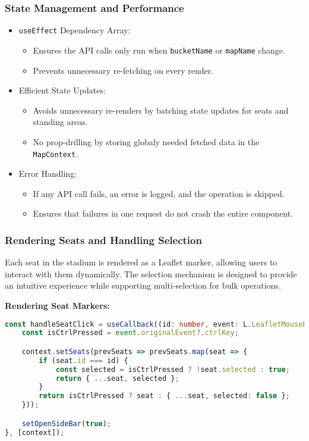 \subsubsection{State Management and Performance}
\begin{itemize}
    \item \texttt{useEffect} Dependency Array:
    \begin{itemize}
        \item Ensures the API calls only run when \texttt{bucketName} or \texttt{mapName} change.
        \item Prevents unnecessary re-fetching on every render.
    \end{itemize}
    
    \item Efficient State Updates:
    \begin{itemize}
        \item Avoids unnecessary re-renders by batching state updates for seats and standing areas.
        \item No prop-drilling by storing globaly needed fetched data in the \texttt{MapContext}.
    \end{itemize}

    \item Error Handling:
    \begin{itemize}
        \item If any API call fails, an error is logged, and the operation is skipped.
        \item Ensures that failures in one request do not crash the entire component.
    \end{itemize}
\end{itemize}

\subsubsection{Rendering Seats and Handling Selection}

Each seat in the stadium is rendered as a Leaflet marker, allowing users to interact with them dynamically. The selection mechanism is designed to provide an intuitive experience while supporting multi-selection for bulk operations.

\textbf{Rendering Seat Markers:}
\begin{lstlisting}[language=TypeScript, caption=Rendering and Selecting Seats, label=lst:seat-rendering]
const handleSeatClick = useCallback((id: number, event: L.LeafletMouseEvent) => {
    const isCtrlPressed = event.originalEvent?.ctrlKey;

    context.setSeats(prevSeats => prevSeats.map(seat => {
        if (seat.id === id) {
            const selected = isCtrlPressed ? !seat.selected : true;
            return { ...seat, selected };
        }
        return isCtrlPressed ? seat : { ...seat, selected: false };
    }));

    setOpenSideBar(true);
}, [context]);
\end{lstlisting}

